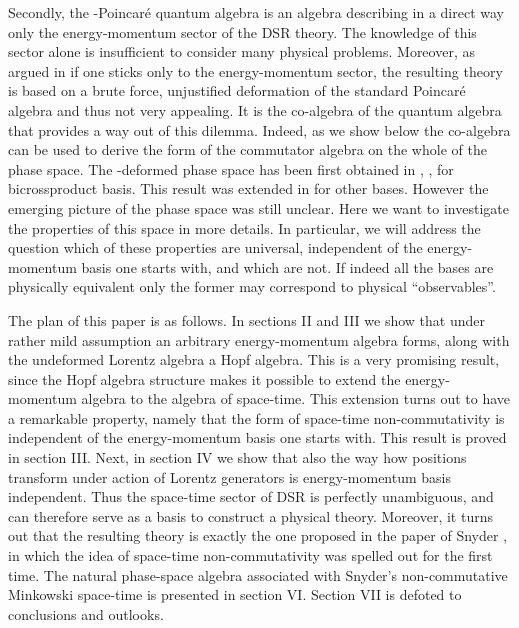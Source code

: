 \documentclass [prd,twocolumn,nofootinbib,showpacs]  {revtex4}
\begin{document}
Secondly, the \myHighlight{$\kappa$}\coordHE{}-Poincar\'e quantum algebra is an algebra
describing in a direct way only the energy-momentum sector of the
DSR theory. The knowledge of this sector alone is insufficient to
consider many physical problems. Moreover, as argued in
\cite{lunoDSR} if one sticks only to the energy-momentum sector,
the resulting theory is based on a brute force, unjustified
deformation of the standard Poincar\'e algebra and thus not very
appealing. It is the co-algebra of the quantum algebra that
provides a way out of this dilemma. Indeed, as we show below  the
co-algebra can be used to derive the form of the commutator
algebra on the whole of the phase space. The \myHighlight{$\kappa$}\coordHE{}-deformed
phase space  has been first obtained in \cite{crossalg},
\cite{luno}, \cite{lukps} for  bicrossproduct basis. This result
was extended  in \cite{juse} for other bases. However the emerging
picture of the phase space was still unclear. Here we want to
investigate the properties of this space in more details. In
particular, we will address the question which of these properties
are universal, independent of the energy-momentum basis one starts
with, and which are not. If indeed all the bases are physically
equivalent only the former may correspond to physical
``observables''.

The plan of this paper is as follows. In sections II and III we
show that under rather mild assumption an arbitrary
energy-momentum algebra forms, along with the undeformed Lorentz
algebra a Hopf algebra. This is a very promising result, since the
Hopf algebra structure makes it possible to extend the
energy-momentum algebra to the algebra of space-time. This
extension turns out to have a remarkable property, namely that the
form of space-time non-commutativity is independent of the
energy-momentum basis one starts with. This result is proved in
section III. Next, in section IV  we show that also the way how
positions transform under action of Lorentz generators is
energy-momentum basis independent. Thus the space-time sector of
DSR is perfectly unambiguous, and can therefore serve as a basis
to construct a physical theory. Moreover, it turns out that the
resulting theory is exactly the one proposed in the  paper of
Snyder \cite{snyder}, in which the idea of space-time
non-commutativity was spelled out for the first time. The natural
phase-space algebra associated with Snyder's non-commutative
Minkowski space-time is presented in section VI. Section VII is
defoted to conclusions and outlooks.
\end{document}
